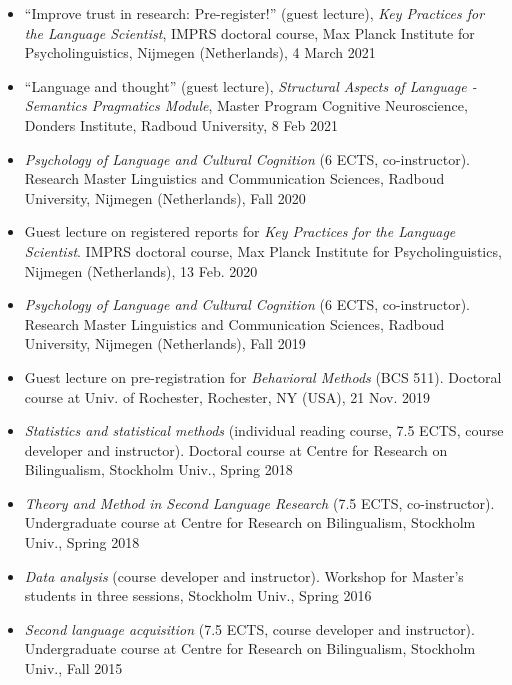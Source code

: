 \documentclass[margin, 11pt]{res} %
\begin{document}
\begin{resume}
\begin{itemize}


\item ``Improve trust in research: Pre-register!'' (guest lecture), \emph{Key Practices for the Language Scientist}, IMPRS doctoral course, Max Planck Institute for Psycholinguistics, Nijmegen (Netherlands), 4 March 2021

\item ``Language and thought'' (guest lecture), \emph{Structural Aspects of Language - Semantics Pragmatics Module}, Master Program Cognitive Neuroscience, Donders Institute, Radboud University, 8 Feb 2021 

\item \textit{Psychology of Language and Cultural Cognition} (6 ECTS, co-instructor). Research Master Linguistics and Communication Sciences, Radboud University, Nijmegen (Netherlands), Fall 2020

\item Guest lecture on registered reports for \textit{Key Practices for the Language Scientist}. IMPRS doctoral course, Max Planck Institute for Psycholinguistics, Nijmegen (Netherlands), 13 Feb. 2020

\item \textit{Psychology of Language and Cultural Cognition} (6 ECTS, co-instructor). Research Master Linguistics and Communication Sciences, Radboud University, Nijmegen (Netherlands), Fall 2019

\item Guest lecture on pre-registration for \textit{Behavioral Methods} (BCS 511). Doctoral course at Univ. of Rochester, Rochester, NY (USA), 21 Nov. 2019

\item \textit{Statistics and statistical methods} (individual reading course, 7.5 ECTS, course developer and instructor). Doctoral course at Centre for Research on Bilingualism, Stockholm Univ., Spring 2018

\item \textit{Theory and Method in Second Language Research} (7.5 ECTS, co-instructor). Undergraduate course at Centre for Research on Bilingualism, Stockholm Univ., Spring 2018

\item \textit{Data analysis} (course developer and instructor). Workshop for Master's students in three sessions, Stockholm Univ., Spring 2016

\item \textit{Second language acquisition} (7.5 ECTS, course developer and instructor). Undergraduate course at Centre for Research on Bilingualism, Stockholm Univ., Fall 2015


\end{itemize}
\end{resume}
\end{document}
